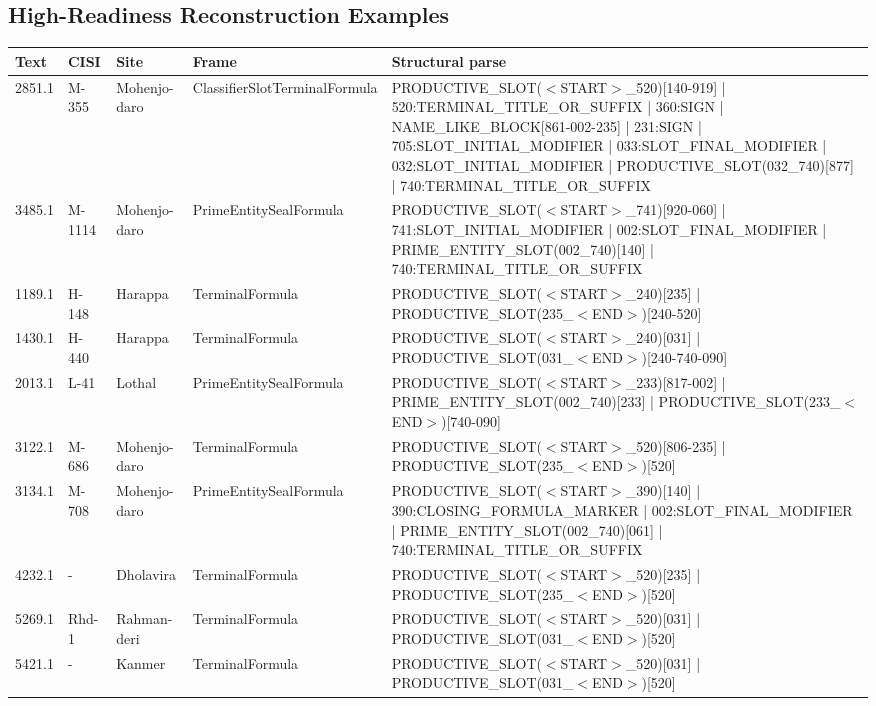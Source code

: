 \documentclass[11pt,a4paper]{article}
\begin{document}
\subsection*{High-Readiness Reconstruction Examples}
\begin{center}
\begin{tabular}{llllp{}}
\toprule
\textbf{Text} & \textbf{CISI} & \textbf{Site} & \textbf{Frame} & \textbf{Structural parse} \\
\midrule
2851.1 & M-355 & Mohenjo-daro & ClassifierSlotTerminalFormula & PRODUCTIVE\_SLOT($<$START$>$\_520)[140-919] | 520:TERMINAL\_TITLE\_OR\_SUFFIX | 360:SIGN | NAME\_LIKE\_BLOCK[861-002-235] | 231:SIGN | 705:SLOT\_INITIAL\_MODIFIER | 033:SLOT\_FINAL\_MODIFIER | 032:SLOT\_INITIAL\_MODIFIER | PRODUCTIVE\_SLOT(032\_740)[877] | 740:TERMINAL\_TITLE\_OR\_SUFFIX \\
3485.1 & M-1114 & Mohenjo-daro & PrimeEntitySealFormula & PRODUCTIVE\_SLOT($<$START$>$\_741)[920-060] | 741:SLOT\_INITIAL\_MODIFIER | 002:SLOT\_FINAL\_MODIFIER | PRIME\_ENTITY\_SLOT(002\_740)[140] | 740:TERMINAL\_TITLE\_OR\_SUFFIX \\
1189.1 & H-148 & Harappa & TerminalFormula & PRODUCTIVE\_SLOT($<$START$>$\_240)[235] | PRODUCTIVE\_SLOT(235\_$<$END$>$)[240-520] \\
1430.1 & H-440 & Harappa & TerminalFormula & PRODUCTIVE\_SLOT($<$START$>$\_240)[031] | PRODUCTIVE\_SLOT(031\_$<$END$>$)[240-740-090] \\
2013.1 & L-41 & Lothal & PrimeEntitySealFormula & PRODUCTIVE\_SLOT($<$START$>$\_233)[817-002] | PRIME\_ENTITY\_SLOT(002\_740)[233] | PRODUCTIVE\_SLOT(233\_$<$END$>$)[740-090] \\
3122.1 & M-686 & Mohenjo-daro & TerminalFormula & PRODUCTIVE\_SLOT($<$START$>$\_520)[806-235] | PRODUCTIVE\_SLOT(235\_$<$END$>$)[520] \\
3134.1 & M-708 & Mohenjo-daro & PrimeEntitySealFormula & PRODUCTIVE\_SLOT($<$START$>$\_390)[140] | 390:CLOSING\_FORMULA\_MARKER | 002:SLOT\_FINAL\_MODIFIER | PRIME\_ENTITY\_SLOT(002\_740)[061] | 740:TERMINAL\_TITLE\_OR\_SUFFIX \\
4232.1 & - & Dholavira & TerminalFormula & PRODUCTIVE\_SLOT($<$START$>$\_520)[235] | PRODUCTIVE\_SLOT(235\_$<$END$>$)[520] \\
5269.1 & Rhd-1 & Rahman-deri & TerminalFormula & PRODUCTIVE\_SLOT($<$START$>$\_520)[031] | PRODUCTIVE\_SLOT(031\_$<$END$>$)[520] \\
5421.1 & - & Kanmer & TerminalFormula & PRODUCTIVE\_SLOT($<$START$>$\_520)[031] | PRODUCTIVE\_SLOT(031\_$<$END$>$)[520] \\
\bottomrule
\end{tabular}
\end{center}
\end{document}
